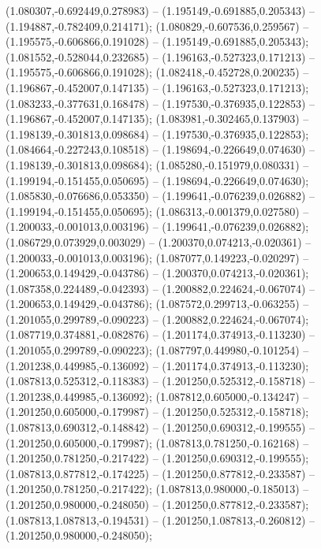  (1.080307,-0.692449,0.278983) -- (1.195149,-0.691885,0.205343) -- (1.194887,-0.782409,0.214171);
 (1.080829,-0.607536,0.259567) -- (1.195575,-0.606866,0.191028) -- (1.195149,-0.691885,0.205343);
 (1.081552,-0.528044,0.232685) -- (1.196163,-0.527323,0.171213) -- (1.195575,-0.606866,0.191028);
 (1.082418,-0.452728,0.200235) -- (1.196867,-0.452007,0.147135) -- (1.196163,-0.527323,0.171213);
 (1.083233,-0.377631,0.168478) -- (1.197530,-0.376935,0.122853) -- (1.196867,-0.452007,0.147135);
 (1.083981,-0.302465,0.137903) -- (1.198139,-0.301813,0.098684) -- (1.197530,-0.376935,0.122853);
 (1.084664,-0.227243,0.108518) -- (1.198694,-0.226649,0.074630) -- (1.198139,-0.301813,0.098684);
 (1.085280,-0.151979,0.080331) -- (1.199194,-0.151455,0.050695) -- (1.198694,-0.226649,0.074630);
 (1.085830,-0.076686,0.053350) -- (1.199641,-0.076239,0.026882) -- (1.199194,-0.151455,0.050695);
 (1.086313,-0.001379,0.027580) -- (1.200033,-0.001013,0.003196) -- (1.199641,-0.076239,0.026882);
 (1.086729,0.073929,0.003029) -- (1.200370,0.074213,-0.020361) -- (1.200033,-0.001013,0.003196);
 (1.087077,0.149223,-0.020297) -- (1.200653,0.149429,-0.043786) -- (1.200370,0.074213,-0.020361);
 (1.087358,0.224489,-0.042393) -- (1.200882,0.224624,-0.067074) -- (1.200653,0.149429,-0.043786);
 (1.087572,0.299713,-0.063255) -- (1.201055,0.299789,-0.090223) -- (1.200882,0.224624,-0.067074);
 (1.087719,0.374881,-0.082876) -- (1.201174,0.374913,-0.113230) -- (1.201055,0.299789,-0.090223);
 (1.087797,0.449980,-0.101254) -- (1.201238,0.449985,-0.136092) -- (1.201174,0.374913,-0.113230);
 (1.087813,0.525312,-0.118383) -- (1.201250,0.525312,-0.158718) -- (1.201238,0.449985,-0.136092);
 (1.087812,0.605000,-0.134247) -- (1.201250,0.605000,-0.179987) -- (1.201250,0.525312,-0.158718);
 (1.087813,0.690312,-0.148842) -- (1.201250,0.690312,-0.199555) -- (1.201250,0.605000,-0.179987);
 (1.087813,0.781250,-0.162168) -- (1.201250,0.781250,-0.217422) -- (1.201250,0.690312,-0.199555);
 (1.087813,0.877812,-0.174225) -- (1.201250,0.877812,-0.233587) -- (1.201250,0.781250,-0.217422);
 (1.087813,0.980000,-0.185013) -- (1.201250,0.980000,-0.248050) -- (1.201250,0.877812,-0.233587);
 (1.087813,1.087813,-0.194531) -- (1.201250,1.087813,-0.260812) -- (1.201250,0.980000,-0.248050);
